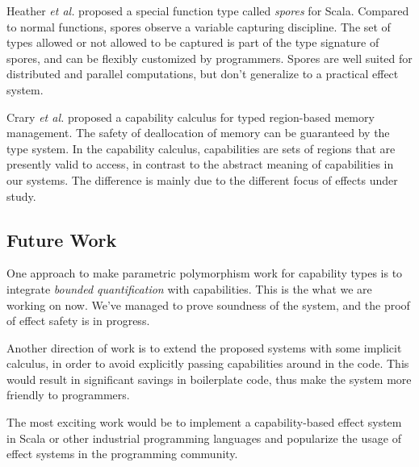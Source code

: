 Heather \emph{et al.} proposed a special function type called
\emph{spores} for Scala\cite{miller2014spores}. Compared to normal
functions, spores observe a variable capturing discipline. The set of
types allowed or not allowed to be captured is part of the type
signature of spores, and can be flexibly customized by
programmers. Spores are well suited for distributed and parallel
computations, but don't generalize to a practical effect system.

Crary \emph{et al.} proposed a capability calculus for typed
region-based memory management\cite{crary1999typed}. The safety of
deallocation of memory can be guaranteed by the type system. In the
capability calculus, capabilities are sets of regions that are
presently valid to access, in contrast to the abstract meaning of
capabilities in our systems. The difference is mainly due to the
different focus of effects under study.

\subsection{Future Work}

One approach to make parametric polymorphism work for capability types
is to integrate \emph{bounded quantification} with capabilities. This
is the what we are working on now. We've managed to prove soundness of
the system, and the proof of effect safety is in progress.

Another direction of work is to extend the proposed systems with some
implicit calculus, in order to avoid explicitly passing capabilities
around in the code. This would result in significant savings in
boilerplate code, thus make the system more friendly to programmers.

The most exciting work would be to implement a capability-based effect
system in Scala or other industrial programming languages and
popularize the usage of effect systems in the programming community.
